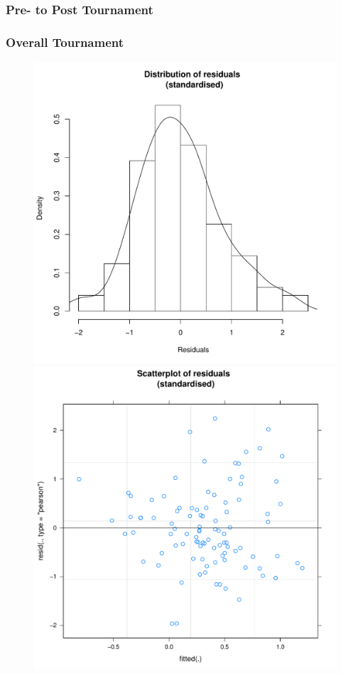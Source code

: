 \begin{CJK}{UTF8}{gbsn}
      \subsubsection{Pre- to Post Tournament\label{app8:MLM23a}}


      




      \subsubsection{Overall Tournament}

      \begin{figure}[htbp]
        \includegraphics[scale =.4]{images/MLM23aHist.pdf}
        \includegraphics[scale =.4]{images/MLM23aScatter.pdf}

\end{figure}
\end{CJK}
